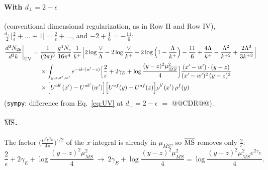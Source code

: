 \documentclass[10pt]{article}
\numberwithin{equation}{section}
\begin{document}
\paragraph{With $d_\perp=2-\epsilon$} (conventional dimensional regularization, as in Row II and Row IV), $\frac{d_\perp}{2}\big[\frac2\epsilon+\dots+1\big]=\frac2\epsilon+\dots$, and $-2+\frac16=-\frac{11}{6}$:
\begin{align}
\frac{d^{3}N_{2b}}{d^{3}k}\bigg|_{\rm UV}={}&\frac{1}{(2\pi)^{3}}\,\frac{g^{4}N_{c}}{16\pi^{4}}\,\frac{1}{k^{+}}\Big[2\log\frac{\vee}{\Lambda}-2\log\frac{\vee}{k^{+}}+2\log\Big(1-\frac{\Lambda}{k^{+}}\Big)-\frac{11}{6}+\frac{4\Lambda}{k^{+}}-\frac{\Lambda^{2}}{k^{+2}}+\frac{2\Lambda^{3}}{3k^{+3}}\Big]\notag\\
&\times\int_{y,z,x',w'}e^{-ik\cdot(w'-z)}\Big[\frac{2}{\epsilon}+2\gamma_{E}+\log\frac{(y-z)^{2}\mu^{2}_{\overline{MS}}}{4}\Big]\frac{(x'-w')\cdot(y-z)}{(x'-w')^{2}\,(y-z)^{2}}\notag\\
&\times\Big[U^{ab'}(x')-U^{ab'}(w')\Big]\Big[U^{af}(y)-U^{af}(z)\Big]\rho^{b'}(x')\,\rho^{f}(y)
\label{eq:UVcdr}
\end{align}
(\texttt{sympy}: difference from Eq.~\eqref{eq:UV} at $d_\perp=2-\epsilon$ $=$ @@CDR@@).

\paragraph{$\overline{\rm MS}$.} The factor $\big(\frac{\mu^2e^{\gamma_E}}{4\pi}\big)^{\epsilon/2}$ of the $x$ integral is already in $\mu_{\overline{MS}}$, so $\overline{\rm MS}$ removes only $\frac2\epsilon$:
\begin{equation}
\frac{2}{\epsilon}+2\gamma_{E}+\log\frac{(y-z)^{2}\mu^{2}_{\overline{MS}}}{4}\ \longrightarrow\ 2\gamma_E+\log\frac{(y-z)^{2}\mu^{2}_{\overline{MS}}}{4}=\log\frac{(y-z)^{2}\mu^{2}_{\overline{MS}}e^{2\gamma_E}}{4}.
\end{equation}
\end{document}
